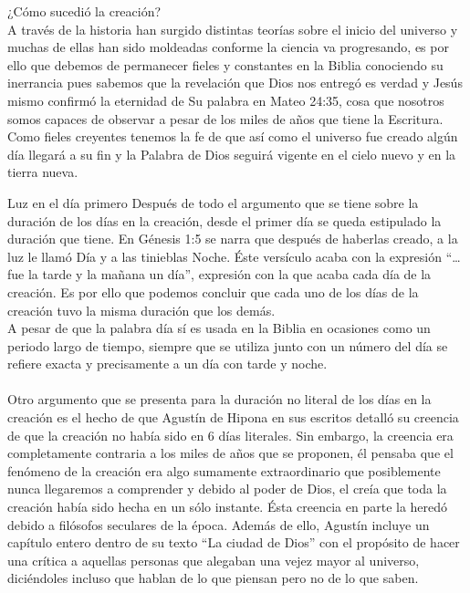 \begin{section}{¿Cómo sucedió la creación?}
\\
A través de la historia han surgido distintas teorías sobre el inicio del universo y muchas de ellas han sido moldeadas conforme la ciencia va progresando, es por ello que debemos de permanecer fieles y constantes en la Biblia conociendo su inerrancia pues sabemos que la revelación que Dios nos entregó es verdad y Jesús mismo confirmó la eternidad de Su palabra en Mateo 24:35, cosa que nosotros somos capaces de observar a pesar de los miles de años que tiene la Escritura.\\
Como fieles creyentes tenemos la fe de que así como el universo fue creado algún día llegará a su fin y la Palabra de Dios seguirá vigente en el cielo nuevo y en la tierra nueva.
\end{section}
\newpage
\begin{section}{Luz en el día primero}
	Después de todo el argumento que se tiene sobre la duración de los días en la creación, desde el primer día se queda estipulado la duración que tiene. En Génesis 1:5 se narra que después de haberlas creado, a la luz le llamó Día y a las tinieblas Noche. Éste versículo acaba con la expresión ``\ldots fue la tarde y la mañana un día'', expresión con la que acaba cada día de la creación. Es por ello que podemos concluir que cada uno de los días de la creación tuvo la misma duración que los demás.\\
	A pesar de que la palabra día sí es usada en la Biblia en ocasiones como un periodo largo de tiempo, siempre que se utiliza junto con un número del día se refiere exacta y precisamente a un día con tarde y noche.\\
	\\
Otro argumento que se presenta para la duración no literal de los días en la creación es el hecho de que Agustín de Hipona en sus escritos detalló su creencia de que la creación no había sido en 6 días literales. Sin embargo, la creencia era completamente contraria a los miles de años que se proponen, él pensaba que el fenómeno de la creación era algo sumamente extraordinario que posiblemente nunca llegaremos a comprender y debido al poder de Dios, el creía que toda la creación había sido hecha en un sólo instante. Ésta creencia en parte la heredó debido a filósofos seculares de la época. Además de ello, Agustín incluye un capítulo entero dentro de su texto ``La ciudad de Dios'' con el propósito de hacer una crítica a aquellas personas que alegaban una vejez mayor al universo, diciéndoles incluso que hablan de lo que piensan pero no de lo que saben.\\

\end{section}

